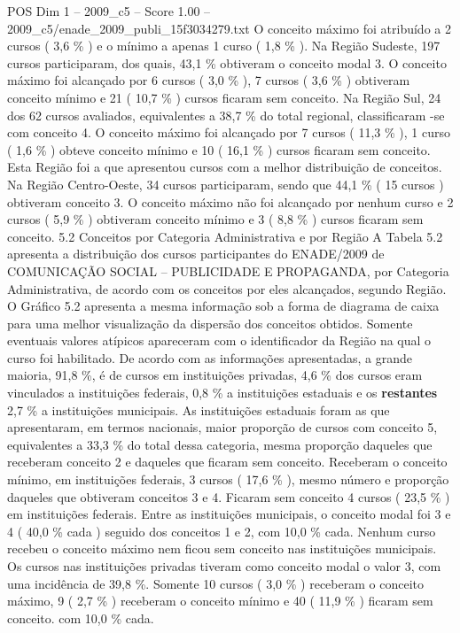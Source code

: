 \begin{textsample}{POS Dim 1 – 2009\_c5 – Score 1.00 – 2009\_c5/enade\_2009\_publi\_15f3034279.txt}
O conceito máximo foi atribuído a 2 cursos ( 3,6 \% ) e o mínimo a apenas 1 curso ( 1,8 \% ).
Na Região Sudeste, 197 cursos participaram, dos quais, 43,1 \% obtiveram o conceito modal 3.
O conceito máximo foi alcançado por 6 cursos ( 3,0 \% ), 7 cursos ( 3,6 \% ) obtiveram conceito mínimo e 21 ( 10,7 \% ) cursos ficaram sem conceito.
Na Região Sul, 24 dos 62 cursos avaliados, equivalentes a 38,7 \% do total regional, classificaram -se com conceito 4.
O conceito máximo foi alcançado por 7 cursos ( 11,3 \% ), 1 curso ( 1,6 \% ) obteve conceito mínimo e 10 ( 16,1 \% ) cursos ficaram sem conceito.
Esta Região foi a que apresentou cursos com a melhor distribuição de conceitos.
Na Região Centro-Oeste, 34 cursos participaram, sendo que 44,1 \% ( 15 cursos ) obtiveram conceito 3.
O conceito máximo não foi alcançado por nenhum curso e 2 cursos ( 5,9 \% ) obtiveram conceito mínimo e 3 ( 8,8 \% ) cursos ficaram sem conceito. 5.2 Conceitos por Categoria Administrativa e por Região A Tabela 5.2 apresenta a distribuição dos cursos participantes do ENADE/2009 de COMUNICAÇÃO SOCIAL – PUBLICIDADE E PROPAGANDA, por Categoria Administrativa, de acordo com os conceitos por eles alcançados, segundo Região.
O Gráfico 5.2 apresenta a mesma informação sob a forma de diagrama de caixa para uma melhor visualização da dispersão dos conceitos obtidos.
Somente eventuais valores atípicos apareceram com o identificador da Região na qual o curso foi habilitado.
De acordo com as informações apresentadas, a grande maioria, 91,8 \%, é de cursos em instituições privadas, 4,6 \% dos cursos eram vinculados a instituições federais, 0,8 \% a instituições estaduais e os \textbf{restantes} 2,7 \% a instituições municipais.
As instituições estaduais foram as que apresentaram, em termos nacionais, maior proporção de cursos com conceito 5, equivalentes a 33,3 \% do total dessa categoria, mesma proporção daqueles que receberam conceito 2 e daqueles que ficaram sem conceito.
Receberam o conceito mínimo, em instituições federais, 3 cursos ( 17,6 \% ), mesmo número e proporção daqueles que obtiveram conceitos 3 e 4.
Ficaram sem conceito 4 cursos ( 23,5 \% ) em instituições federais.
Entre as instituições municipais, o conceito modal foi 3 e 4 ( 40,0 \% cada ) seguido dos conceitos 1 e 2, com 10,0 \% cada.
Nenhum curso recebeu o conceito máximo nem ficou sem conceito nas instituições municipais.
Os cursos nas instituições privadas tiveram como conceito modal o valor 3, com uma incidência de 39,8 \%.
Somente 10 cursos ( 3,0 \% ) receberam o conceito máximo, 9 ( 2,7 \% ) receberam o conceito mínimo e 40 ( 11,9 \% ) ficaram sem conceito. com 10,0 \% cada.

\end{textsample}
